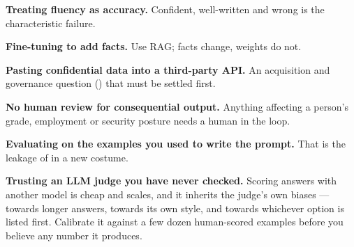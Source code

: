 \begin{pitfall}
\begin{tight}
  \item \textbf{Treating fluency as accuracy.} Confident, well-written and wrong is
        the characteristic failure.
  \item \textbf{Fine-tuning to add facts.} Use RAG; facts change, weights do not.
  \item \textbf{Pasting confidential data into a third-party API.} An acquisition
        and governance question () that must be settled first.
  \item \textbf{No human review for consequential output.} Anything affecting a
        person's grade, employment or security posture needs a human in the loop.
  \item \textbf{Evaluating on the examples you used to write the prompt.} That is
        the leakage of  in a new costume.
  \item \textbf{Trusting an LLM judge you have never checked.} Scoring answers with
        another model is cheap and scales, and it inherits the judge's own biases ---
        towards longer answers, towards its own style, and towards whichever option
        is listed first. Calibrate it against a few dozen human-scored examples
        before you believe any number it produces.
\end{tight}
\end{pitfall}

